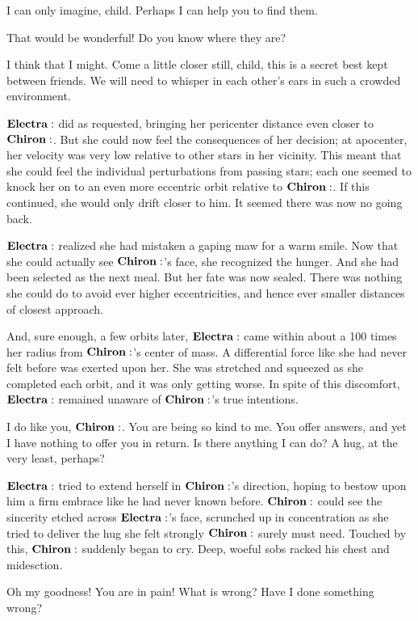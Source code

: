 \Chiron I can only imagine, child.  Perhaps I can help you to find them.

\Electra That would be wonderful!  Do you know where they are?

\Chiron I think that I might.  Come a little closer still, child, this is a secret best kept between friends.  We will need to whisper in each other's ears in such a crowded environment.

$\Electra$ did as requested, bringing her pericenter distance even closer to $\Chiron$.  But she could now feel the consequences of her decision; at apocenter, her velocity was very low relative to other stars in her vicinity.  This meant that she could feel the individual perturbations from passing stars; each one seemed to knock her on to an even more eccentric orbit relative to $\Chiron$.  If this continued, she would only drift closer to him.  It seemed there was now no going back.

$\Electra$ realized she had mistaken a gaping maw for a warm smile.  Now that she could actually see $\Chiron$'s face, she recognized the hunger.  And she had been selected as the next meal.  But her fate was now sealed.  There was nothing she could do to avoid ever higher eccentricities, and hence ever smaller distances of closest approach.  

And, sure enough, a few orbits later, $\Electra$ came within about a 100 times her radius from $\Chiron$'s center of mass.  A differential force like she had never felt before was exerted upon her.  She was stretched and squeezed as she completed each orbit, and it was only getting worse.  In spite of this discomfort, $\Electra$ remained unaware of $\Chiron$'s true intentions.

\Electra I do like you, $\Chiron$.  You are being so kind to me.  You offer answers, and yet I have nothing to offer you in return.  Is there anything I can do?  A hug, at the very least, perhaps?

$\Electra$ tried to extend herself in $\Chiron$'s direction, hoping to bestow upon him a firm embrace like he had never known before.  $\Chiron$ could see the sincerity etched across $\Electra$'s face, scrunched up in concentration as she tried to deliver the hug she felt strongly $\Chiron$ surely must need.  Touched by this, $\Chiron$ suddenly began to cry.  Deep, woeful sobs racked his chest and midesction.

\Electra Oh my goodness!  You are in pain!  What is wrong?  Have I done something wrong?

